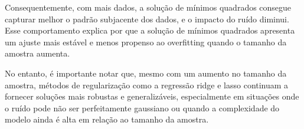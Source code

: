 Consequentemente, com mais dados, a solução de mínimos quadrados consegue capturar melhor o padrão subjacente dos dados, e o impacto do ruído diminui. Esse comportamento explica por que a solução de mínimos quadrados apresenta um ajuste mais estável e menos propenso ao overfitting quando o tamanho da amostra aumenta.

No entanto, é importante notar que, mesmo com um aumento no tamanho da amostra, métodos de regularização como a regressão ridge e lasso continuam a fornecer soluções mais robustas e generalizáveis, especialmente em situações onde o ruído pode não ser perfeitamente gaussiano ou quando a complexidade do modelo ainda é alta em relação ao tamanho da amostra.







